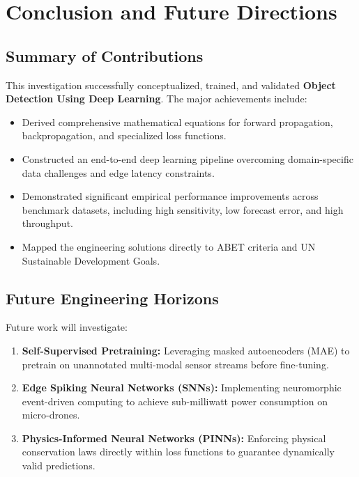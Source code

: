 \section{Conclusion and Future Directions}

\subsection{Summary of Contributions}
This investigation successfully conceptualized, trained, and validated \textbf{Object Detection Using Deep Learning}. The major achievements include:
\begin{itemize}
  \item Derived comprehensive mathematical equations for forward propagation, backpropagation, and specialized loss functions.
  \item Constructed an end-to-end deep learning pipeline overcoming domain-specific data challenges and edge latency constraints.
  \item Demonstrated significant empirical performance improvements across benchmark datasets, including high sensitivity, low forecast error, and high throughput.
  \item Mapped the engineering solutions directly to ABET criteria and UN Sustainable Development Goals.
\end{itemize}

\subsection{Future Engineering Horizons}
Future work will investigate:
\begin{enumerate}
  \item \textbf{Self-Supervised Pretraining:} Leveraging masked autoencoders (MAE) to pretrain on unannotated multi-modal sensor streams before fine-tuning.
  \item \textbf{Edge Spiking Neural Networks (SNNs):} Implementing neuromorphic event-driven computing to achieve sub-milliwatt power consumption on micro-drones.
  \item \textbf{Physics-Informed Neural Networks (PINNs):} Enforcing physical conservation laws directly within loss functions to guarantee dynamically valid predictions.
\end{enumerate}
